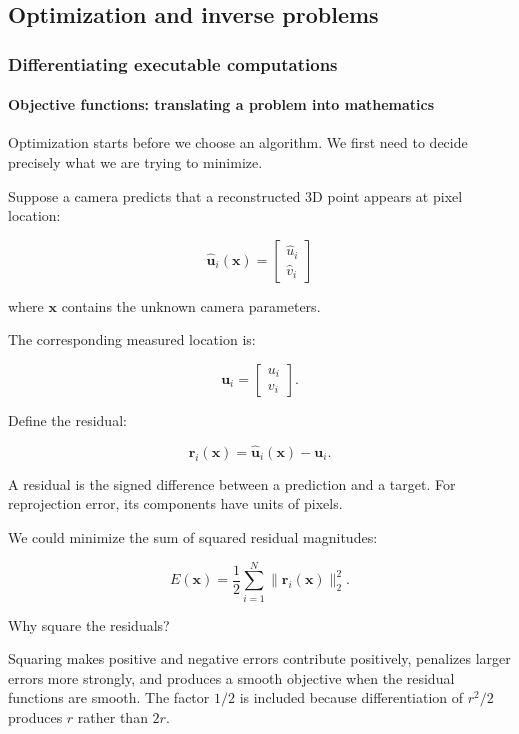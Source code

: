 \subsection{Optimization and inverse problems}\label{optimization-and-inverse-problems}

\subsubsection{Differentiating executable computations}\label{differentiating-executable-computations}

\paragraph{Objective functions: translating a problem into mathematics}\label{objective-functions-translating-a-problem-into-mathematics}

Optimization starts before we choose an algorithm. We first need to decide precisely what we are trying to minimize.

Suppose a camera predicts that a reconstructed 3D point appears at pixel location:

\[
\hat{\mathbf u}_i(\mathbf x)= \begin{bmatrix}\hat u_i\\\hat v_i\end{bmatrix}
\]

where \(\mathbf x\) contains the unknown camera parameters.

The corresponding measured location is:

\[
\mathbf u_i= \begin{bmatrix}u_i\\v_i\end{bmatrix}.
\]

Define the residual:

\[
\boxed{ \mathbf r_i(\mathbf x) = \hat{\mathbf u}_i(\mathbf x)-\mathbf u_i }.
\]

A residual is the signed difference between a prediction and a target. For reprojection error, its components have units of pixels.

We could minimize the sum of squared residual magnitudes:

\[
\boxed{ E(\mathbf x)= \frac12\sum_{i=1}^{N} \|\mathbf r_i(\mathbf x)\|_2^2 }.
\]

Why square the residuals?

Squaring makes positive and negative errors contribute positively, penalizes larger errors more strongly, and produces a smooth objective when the residual functions are smooth. The factor \(1/2\) is included because differentiation of \(r^2/2\) produces \(r\) rather than \(2r\).


